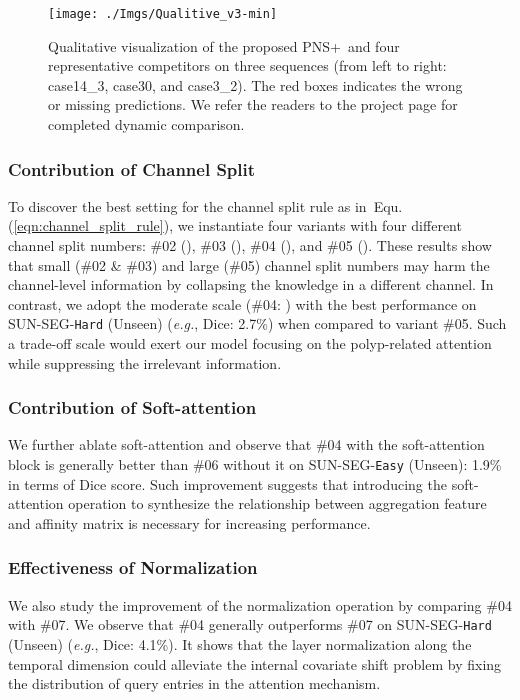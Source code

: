 \documentclass[default,iicol]{sn-jnl}
\theoremstyle{thmstyleone}
\theoremstyle{thmstyletwo}
\theoremstyle{thmstylethree}
\newcommand{\eqnref}[1]{Equ.(\ref{#1})}
\def\eg{\emph{e.g.}}
\def\ourmodel{PNS+}
\def\ourdataset{SUN-SEG}
\begin{document}
\begin{figure*}[t!]
    \centering
    \texttt{[image: ./Imgs/Qualitive\_v3-min]}
    \caption{Qualitative visualization of the proposed \ourmodel~and four representative competitors on three sequences (from left to right: case14\_3, case30, and case3\_2).
The red boxes indicates the wrong or missing predictions.
We refer the readers to the project page for completed dynamic comparison.
    }\label{fig:front_figure}
\end{figure*}

\subsubsection{Contribution of Channel Split}
To discover the best setting for the channel split rule as in~\eqnref{eqn:channel_split_rule}, we instantiate four variants with four different channel split numbers: \#02 (), \#03 (), \#04 (), and \#05 ().
These results show that small (\#02 \& \#03) and large (\#05) channel split numbers may harm the channel-level information by collapsing the knowledge in a different channel.
In contrast, we adopt the moderate scale (\#04: ) with the best performance on \ourdataset-\texttt{Hard} (Unseen) (\eg, Dice: 2.7\%) when compared to variant \#05.
Such a trade-off scale would exert our model focusing on the polyp-related attention while suppressing the irrelevant information.

\subsubsection{Contribution of Soft-attention}
We further ablate soft-attention and observe that \#04 with the soft-attention block is generally better than \#06 without it on \ourdataset-\texttt{Easy} (Unseen): 1.9\% in terms of Dice score.
Such improvement suggests that introducing the soft-attention operation to synthesize the relationship between aggregation feature and affinity matrix is necessary for increasing performance.

\subsubsection{Effectiveness of Normalization}
We also study the improvement of the normalization operation by comparing \#04 with \#07.
We observe that \#04 generally outperforms \#07 on \ourdataset-\texttt{Hard} (Unseen) (\eg, Dice: 4.1\%).
It shows that the layer normalization along the temporal dimension could alleviate the internal covariate shift problem by fixing the distribution of query entries in the attention mechanism.
\end{document}
